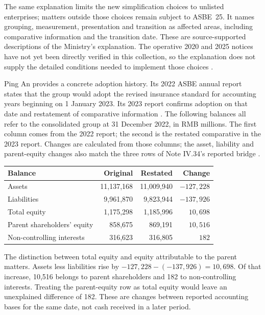 The same explanation limits the new simplification choices to unlisted
enterprises; matters outside those choices remain subject to ASBE~25. It names
grouping, measurement, presentation and transition as affected areas, including
comparative information and the transition date. These are source-supported
descriptions of the Ministry's explanation. The operative 2020 and 2025 notices
have not yet been directly verified in this collection, so the explanation
does not supply the detailed conditions needed to implement those choices
\citep[answer on the relationship between the notice and the standard]{mofinsurance2025qa}.

Ping An provides a concrete adoption history. Its 2022 ASBE annual report
states that the group would adopt the revised insurance standard for accounting
years beginning on 1 January 2023. Its 2023 report confirms adoption on that
date and restatement of comparative information
\citep[Note XIV.2, pp.~315--316]{pingan2022asbe}
\citep[Note IV.34, p.~192]{pingan2023asbe}. The following balances all refer
to the consolidated group at 31 December 2022, in RMB millions. The first
column comes from the 2022 report; the second is the restated comparative in
the 2023 report. Changes are calculated from those columns; the asset,
liability and parent-equity changes also match the three rows of Note IV.34's
reported bridge \citep[pp.~146--148]{pingan2022asbe}
\citep[pp.~141--143 and 192]{pingan2023asbe}.

\begin{center}
\small
\begin{tabularx}{\linewidth}{@{}Xrrr@{}}
\toprule
Balance & Original & Restated & Change\\
\midrule
Assets & 11,137,168 & 11,009,940 & $-127,228$\\
Liabilities & 9,961,870 & 9,823,944 & $-137,926$\\
Total equity & 1,175,298 & 1,185,996 & $10,698$\\
Parent shareholders' equity & 858,675 & 869,191 & $10,516$\\
Non-controlling interests & 316,623 & 316,805 & $182$\\
\bottomrule
\end{tabularx}
\end{center}

The distinction between total equity and equity attributable to the parent
matters. Assets less liabilities rise by
$-127,228-(-137,926)=10,698$. Of that increase, 10,516 belongs to parent
shareholders and 182 to non-controlling interests. Treating the parent-equity
row as total equity would leave an unexplained difference of 182. These are
changes between reported accounting bases for the same date, not cash received
in a later period.

